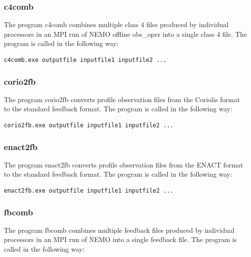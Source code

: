 \subsubsection{c4comb}

The program c4comb combines multiple class 4 files produced by individual processors in an
MPI run of NEMO offline obs\_oper into a single class 4 file. The program is called in the following way:

\begin{alltt}
\footnotesize
\begin{verbatim}
c4comb.exe outputfile inputfile1 inputfile2 ...
\end{verbatim}
\end{alltt}

\subsubsection{corio2fb}

The program corio2fb converts profile observation files from the Coriolis format to the
standard feedback format. The program is called in the following way:

\begin{alltt}
\footnotesize
\begin{verbatim}
corio2fb.exe outputfile inputfile1 inputfile2 ...
\end{verbatim}
\end{alltt}

\subsubsection{enact2fb}

The program enact2fb converts profile observation files from the ENACT format to the standard
feedback format. The program is called in the following way:

\begin{alltt}
\footnotesize
\begin{verbatim}
enact2fb.exe outputfile inputfile1 inputfile2 ...
\end{verbatim}
\end{alltt}

\subsubsection{fbcomb}

The program fbcomb combines multiple feedback files produced by individual processors in an
MPI run of NEMO into a single feedback file. The program is called in the following way:

